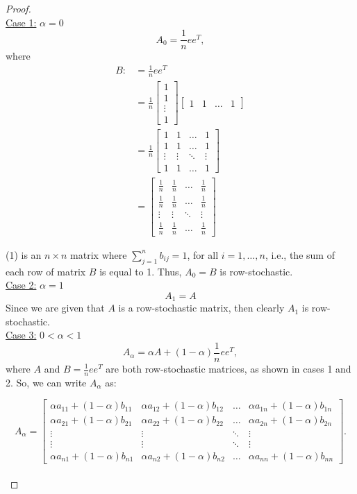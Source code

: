 \documentclass[12pt]{article}
\begin{document}
\begin{proof} $\text{ }$\\

\underline{Case 1:} $\alpha = 0$
$$A_0 = \frac{1}{n}ee^T,$$
where
\begin{align}
B :&= \frac{1}{n}ee^T \nonumber \\
&= \frac{1}{n} \begin{bmatrix}
		1 \\
		1 \\
		\vdots \\
		1 \end{bmatrix}
		\begin{bmatrix}
		1 & 1 & \hdots & 1
		\end{bmatrix} \nonumber \\
&= \frac{1}{n} \begin{bmatrix}
				1 & 1 & \hdots & 1 \\
				1 & 1 & \hdots & 1 \\
				\vdots & \vdots & \ddots & \vdots \\
				1 & 1 & \hdots & 1 
				\end{bmatrix} \nonumber \\
&= \begin{bmatrix}
	\frac{1}{n} & \frac{1}{n} & \hdots & \frac{1}{n} \\
	\frac{1}{n} & \frac{1}{n} & \hdots & \frac{1}{n} \\
	\vdots & \vdots & \ddots & \vdots \\
	\frac{1}{n} & \frac{1}{n} & \hdots & \frac{1}{n} 
	\end{bmatrix}  				
\end{align}

(1) is an $n\times n$ matrix where $\sum_{j=1}^n b_{ij} = 1$, for all $i=1, \hdots , n$, i.e., the sum of each row of matrix $B$ is equal to 1.  Thus, $A_0 = B$ is row-stochastic.\\

\underline{Case 2:} $\alpha = 1$\\
$$A_1 = A$$
Since we are given that $A$ is a row-stochastic matrix, then clearly $A_1$ is row-stochastic.\\

\underline{Case 3:} $0 < \alpha < 1$\\
$$A_{\alpha} = \alpha A + (1-\alpha)\frac{1}{n}ee^T,$$
where $A$ and $B = \frac{1}{n}ee^T$ are both row-stochastic matrices, as shown in cases 1 and 2.  So, we can write $A_{\alpha}$ as:

$$A_{\alpha} = \begin{bmatrix}
				\alpha a_{11}+(1-\alpha)b_{11} & \alpha a_{12}+(1-\alpha)b_{12} & \hdots & \alpha a_{1n}+(1-\alpha)b_{1n} \\
				\alpha a_{21}+(1-\alpha)b_{21} & \alpha a_{22}+(1-\alpha)b_{22} & \hdots & \alpha a_{2n}+(1-\alpha)b_{2n} \\
				\vdots & \vdots & \ddots & \vdots \\
				\vdots & \vdots & \ddots & \vdots \\
				\alpha a_{n1}+(1-\alpha)b_{n1} & \alpha a_{n2}+(1-\alpha)b_{n2} & \hdots & \alpha a_{nn}+(1-\alpha)b_{nn} 
				\end{bmatrix}. $$\\


\end{proof}
\end{document}

